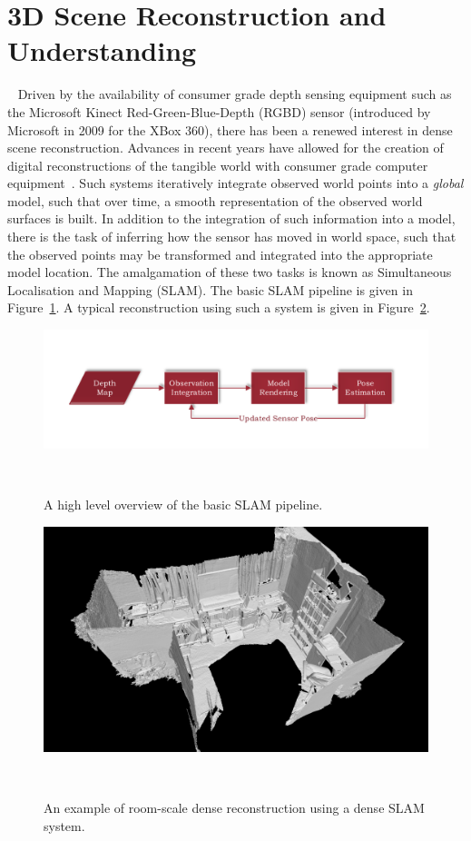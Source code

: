 \section{3D Scene Reconstruction and Understanding}
~\label{sec:intro_scene_recon}
Driven by the availability of consumer grade depth sensing equipment such as the Microsoft Kinect Red-Green-Blue-Depth (RGBD) 
sensor (introduced by Microsoft in 2009 for the XBox 360), there has been a renewed interest in dense scene reconstruction. 
Advances in recent years have allowed for the creation of digital reconstructions of the tangible world with 
consumer grade computer equipment~\cite{Newcombe2011,Kahler2016,Whelan2015}. Such systems iteratively integrate 
observed world points into a \textit{global} model, such that over time, a smooth representation of the observed world 
surfaces is built. In addition to the integration of such information into a model, there is the task of inferring 
how the sensor has moved in world space, such that the observed points may be transformed and integrated into the 
appropriate model location. The amalgamation of these two tasks is known as Simultaneous Localisation and Mapping (SLAM). 
The basic SLAM pipeline is given in Figure~\ref{figure:basic_slam}. A typical reconstruction using such a system is given 
in Figure~\ref{figure:room_recon_example}.
\begin{figure}[!htbp]
  \centering
  \includegraphics[width=\linewidth]{figures/intro/basic_slam.pdf}
  \caption[Basic SLAM Pipeline]{A high level overview of the basic SLAM pipeline.}
~\label{figure:basic_slam}
\end{figure}

\begin{figure}[!htbp]
  \centering
  \includegraphics[width=.8\linewidth]{figures/intro/room_scene.png}
  \caption[Room Scale Dense Reconstruction]{An example of room-scale dense reconstruction using a dense SLAM system.}
~\label{figure:room_recon_example}
\end{figure}

